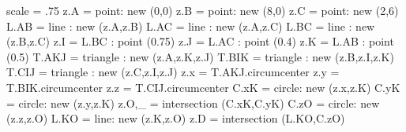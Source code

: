 \begin{tkzelements}
   scale = .75
   z.A     = point: new (0,0)
   z.B     = point: new (8,0)
   z.C     = point: new (2,6)
   L.AB    = line : new (z.A,z.B)
   L.AC    = line : new (z.A,z.C)
   L.BC    = line : new (z.B,z.C)
   z.I     = L.BC : point (0.75)
   z.J     = L.AC : point (0.4)
   z.K     = L.AB : point (0.5)
   T.AKJ   = triangle : new (z.A,z.K,z.J)
   T.BIK   = triangle : new (z.B,z.I,z.K)
   T.CIJ   = triangle : new (z.C,z.I,z.J)
   z.x     = T.AKJ.circumcenter
   z.y     = T.BIK.circumcenter
   z.z     = T.CIJ.circumcenter
   C.xK    = circle: new (z.x,z.K)
   C.yK    = circle: new (z.y,z.K)
   z.O,_   = intersection (C.xK,C.yK)
   C.zO    = circle: new (z.z,z.O)
   L.KO    = line: new (z.K,z.O)
   z.D     = intersection (L.KO,C.zO)
\end{tkzelements}

\begin{center}
\end{center}



